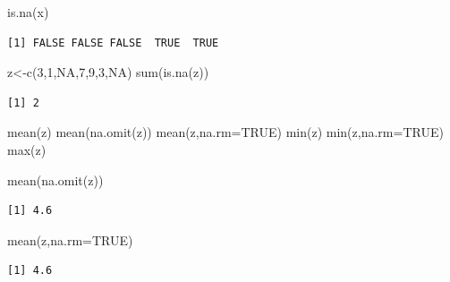\documentclass[
  ignorenonframetext,
  aspectratio=169,
  spanish,
]{beamer}
\newenvironment{Shaded}{\begin{snugshade}}{\end{snugshade}}
\newcommand{\AttributeTok}[1]{\textcolor[rgb]{0.40,0.45,0.13}{#1}}
\newcommand{\ConstantTok}[1]{\textcolor[rgb]{0.56,0.35,0.01}{#1}}
\newcommand{\DecValTok}[1]{\textcolor[rgb]{0.68,0.00,0.00}{#1}}
\newcommand{\FunctionTok}[1]{\textcolor[rgb]{0.28,0.35,0.67}{#1}}
\newcommand{\NormalTok}[1]{\textcolor[rgb]{0.00,0.23,0.31}{#1}}
\newcommand{\OtherTok}[1]{\textcolor[rgb]{0.00,0.23,0.31}{#1}}
\begin{document}
\begin{frame}[fragile]{}
\label{section-9}
\begin{Shaded}
\begin{Highlighting}[]
\FunctionTok{is.na}\NormalTok{(x)}
\end{Highlighting}
\end{Shaded}

\begin{verbatim}
[1] FALSE FALSE FALSE  TRUE  TRUE
\end{verbatim}

\begin{Shaded}
\begin{Highlighting}[]
\NormalTok{z}\OtherTok{\textless{}{-}}\FunctionTok{c}\NormalTok{(}\DecValTok{3}\NormalTok{,}\DecValTok{1}\NormalTok{,}\ConstantTok{NA}\NormalTok{,}\DecValTok{7}\NormalTok{,}\DecValTok{9}\NormalTok{,}\DecValTok{3}\NormalTok{,}\ConstantTok{NA}\NormalTok{)}
\FunctionTok{sum}\NormalTok{(}\FunctionTok{is.na}\NormalTok{(z))}
\end{Highlighting}
\end{Shaded}

\begin{verbatim}
[1] 2
\end{verbatim}
\end{frame}

\begin{frame}[fragile]{}
\label{section-10}
\begin{Shaded}
\begin{Highlighting}[]
\FunctionTok{mean}\NormalTok{(z)}
\FunctionTok{mean}\NormalTok{(}\FunctionTok{na.omit}\NormalTok{(z))}
\FunctionTok{mean}\NormalTok{(z,}\AttributeTok{na.rm=}\ConstantTok{TRUE}\NormalTok{)}
\FunctionTok{min}\NormalTok{(z)}
\FunctionTok{min}\NormalTok{(z,}\AttributeTok{na.rm=}\ConstantTok{TRUE}\NormalTok{)}
\FunctionTok{max}\NormalTok{(z)}
\end{Highlighting}
\end{Shaded}
\end{frame}

\begin{frame}[fragile]{}
\label{section-11}
\begin{Shaded}
\begin{Highlighting}[]
\FunctionTok{mean}\NormalTok{(}\FunctionTok{na.omit}\NormalTok{(z))}
\end{Highlighting}
\end{Shaded}

\begin{verbatim}
[1] 4.6
\end{verbatim}

\begin{Shaded}
\begin{Highlighting}[]
\FunctionTok{mean}\NormalTok{(z,}\AttributeTok{na.rm=}\ConstantTok{TRUE}\NormalTok{)}
\end{Highlighting}
\end{Shaded}

\begin{verbatim}
[1] 4.6
\end{verbatim}
\end{frame}
\end{document}
